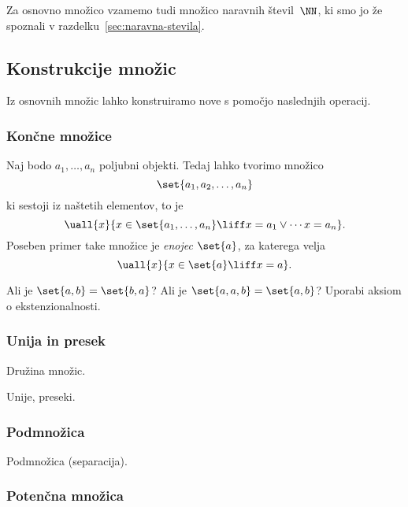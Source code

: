 Za osnovno množico vzamemo tudi množico naravnih števil~$\NN$, ki smo jo že spoznali v razdelku~\ref{sec:naravna-stevila}.

\subsection{Konstrukcije množic}
\label{sec:konstrukcije-mnozic}

Iz osnovnih množic lahko konstruiramo nove s pomočjo naslednjih operacij.

\subsubsection{Končne množice}
\label{sec:koncne-mnozice}

Naj bodo $a_1, \ldots, a_n$ poljubni objekti. Tedaj lahko tvorimo množico
%
\begin{equation*}
  \set{a_1, a_2, \ldots, a_n}
\end{equation*}
%
ki sestoji iz naštetih elementov, to je
%
\begin{equation*}
  \uall{x}{x \in \set{a_1, \ldots, a_n} \liff
    x = a_1 \lor \cdots x = a_n}.
\end{equation*}
%
Poseben primer take množice je \emph{enojec} $\set{a}$, za katerega velja
%
\begin{equation*}
  \uall{x}{x \in \set{a} \liff x = a}.
\end{equation*}


\begin{naloga}
  Ali je $\set{a, b} = \set{b, a}$? Ali je $\set{a, a, b} = \set{a, b}$? Uporabi aksiom o ekstenzionalnosti.
\end{naloga}

\subsubsection{Unija in presek}
\label{sec:unija-presek}

Družina množic.

Unije, preseki.

\subsubsection{Podmnožica}
\label{sec:podmnozica}

Podmnožica (separacija).

\subsubsection{Potenčna množica}
\label{sec:potencna-mnozica}

